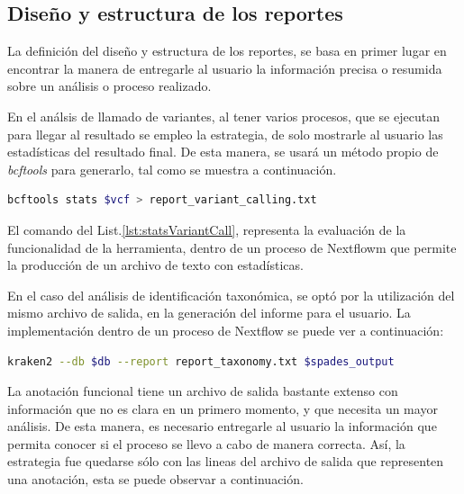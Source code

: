 \documentclass[12pt]{article}
\begin{document}
\subsection{Diseño y estructura de los reportes}

La definición del diseño y estructura de los 
reportes, se basa en primer lugar en encontrar 
la manera de entregarle al usuario la información 
precisa o resumida sobre un análisis o proceso 
realizado.

En el análsis de llamado de variantes, al tener varios procesos,
que se ejecutan para llegar al resultado se empleo la estrategia, 
de solo mostrarle al usuario las estadísticas del resultado final.
De esta manera, se usará un método propio de \emph{bcftools} para generarlo,
tal como se muestra a continuación.


\begin{center}
    \begin{lstlisting}[language=bash, caption=Comando para la generación de estadísticas en el análisis de llamado de variantes \emph{(elaboración propia)}., label=lst:statsVariantCall]
        bcftools stats $vcf > report_variant_calling.txt
    \end{lstlisting}
\end{center}

El comando del List.\ref{lst:statsVariantCall}, representa la evaluación de la funcionalidad de la herramienta,
dentro de un proceso de Nextflowm que permite la producción de un archivo de texto con estadísticas.

En el caso del análisis de identificación taxonómica, se optó por la utilización del mismo archivo de salida, en la generación
del informe para el usuario. La implementación dentro de un proceso de Nextflow se puede ver a continuación:

\begin{center}
    \begin{lstlisting}[language=bash, caption=Comando para la generación del reporte de llamado de variantes \emph{(elaboración propia)}., label=lst:statsTaxonomy]
        kraken2 --db $db --report report_taxonomy.txt $spades_output 
    \end{lstlisting}
\end{center}

La anotación funcional tiene un archivo de salida bastante extenso con información que no es clara en un primero momento, 
y que necesita un mayor análisis. De esta manera, es necesario entregarle al usuario la información que permita conocer si el 
proceso se llevo a cabo de manera correcta. Así, la estrategia fue quedarse sólo con las lineas del archivo de salida que representen una
anotación, esta se puede observar a continuación. 
\end{document}
